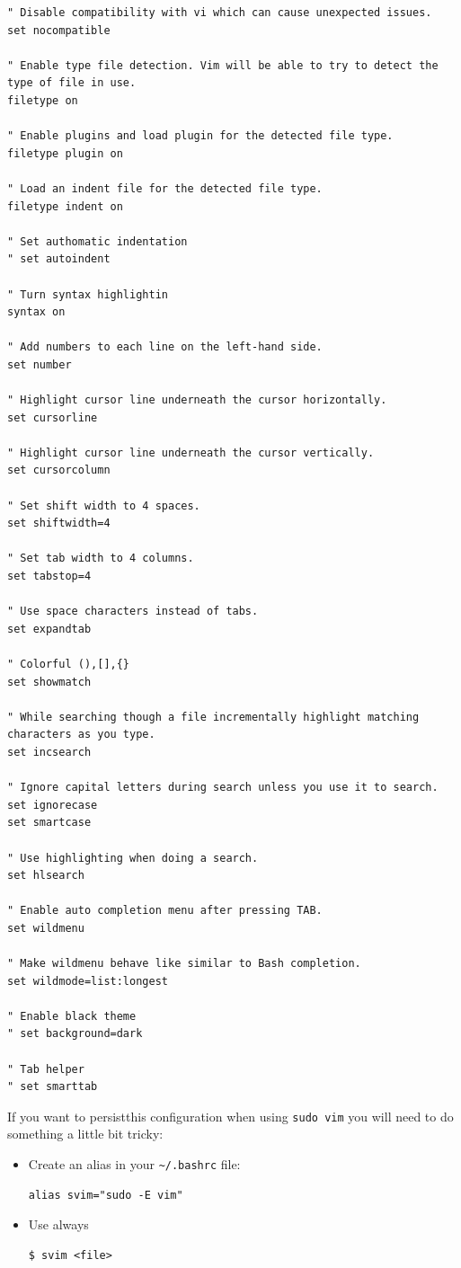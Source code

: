 \documentclass{article}
\newenvironment{codetemplate}[1][]{%
  \mybasecolorbox[#1]
  \itshape
}{%
  \endmybasecolorbox
}
\begin{document}
\begin{codetemplate}{}
\begin{verbatim}
" Disable compatibility with vi which can cause unexpected issues.
set nocompatible

" Enable type file detection. Vim will be able to try to detect the type of file in use.
filetype on

" Enable plugins and load plugin for the detected file type.
filetype plugin on

" Load an indent file for the detected file type.
filetype indent on

" Set authomatic indentation
" set autoindent

" Turn syntax highlightin
syntax on

" Add numbers to each line on the left-hand side.
set number

" Highlight cursor line underneath the cursor horizontally.
set cursorline

" Highlight cursor line underneath the cursor vertically.
set cursorcolumn

" Set shift width to 4 spaces.
set shiftwidth=4

" Set tab width to 4 columns.
set tabstop=4

" Use space characters instead of tabs.
set expandtab

" Colorful (),[],{}
set showmatch

" While searching though a file incrementally highlight matching characters as you type.
set incsearch

" Ignore capital letters during search unless you use it to search.
set ignorecase
set smartcase

" Use highlighting when doing a search.
set hlsearch

" Enable auto completion menu after pressing TAB.
set wildmenu

" Make wildmenu behave like similar to Bash completion.
set wildmode=list:longest

" Enable black theme
" set background=dark

" Tab helper
" set smarttab
\end{verbatim}
\end{codetemplate}

If you want to persistthis configuration when using \verb|sudo vim| you will need to do something a little bit tricky:

\begin{itemize}
    \item Create an alias in your \verb|~/.bashrc| file:
\begin{codetemplate}{}
\begin{verbatim}
alias svim="sudo -E vim"
\end{verbatim}
\end{codetemplate}

    \item Use always
\begin{codetemplate}{}
\begin{verbatim}
$ svim <file>
\end{verbatim}
\end{codetemplate}
\end{itemize}
\end{document}
